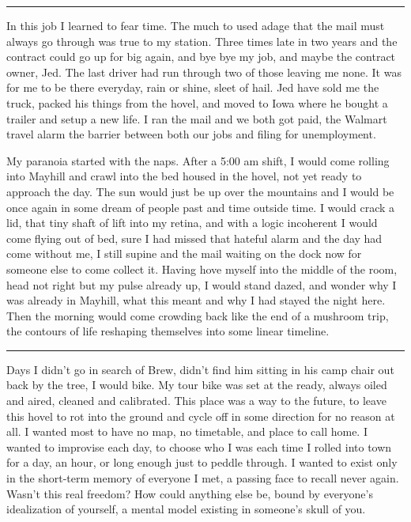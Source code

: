 \documentclass[ebook, 10pt, openright, onecolumn]{memoir}
\newcommand*\td[1]{
  \todo[inline]{
     #1 
  }
}
\newcommand*\starbreak{\fancybreak*{\Large{* * *}}}
\newcommand*\finish{\td{ ----- Finish this section -----}}
\begin{document}
\starbreak

In this job I learned to fear time.  The much to used adage that the mail must
always go through was true to my station. Three times late in two years and the
contract could go up for big again, and bye bye my job, and maybe the contract
owner, Jed.  The last driver had run through two of those leaving me none.  It
was for me to be there everyday, rain or shine, sleet of hail.  Jed have sold me
the truck, packed his things from the hovel, and moved to Iowa where he bought a
trailer and setup a new life.  I ran the mail and we both got paid, the Walmart
travel alarm the barrier between both our jobs and filing for unemployment.

My paranoia started with the naps.  After a 5:00 am shift, I would come rolling
into Mayhill and crawl into the bed housed in the hovel, not yet ready to
approach the day.  The sun would just be up over the mountains and I would be
once again in some dream of people past and time outside time.  I would crack a
lid, that tiny shaft of lift into my retina, and with a logic incoherent I would
come flying out of bed, sure I had missed that hateful alarm and the day had
come without me, I still supine and the mail waiting on the dock now for
someone else to come collect it.  Having hove myself into the middle of the
room, head not right but my pulse already up, I would stand dazed, and wonder
why I was already in Mayhill, what this meant and why I had stayed the night
here.  Then the morning would come crowding back like the end of a mushroom
trip, the contours of life reshaping themselves into some linear timeline. 


\finish


\starbreak

Days I didn't go in search of Brew, didn't find him sitting in his
camp chair out back by the tree, I would bike.  My tour bike was set at the
ready, always oiled and aired, cleaned and calibrated.  This place was a way to
the future, to leave this hovel to rot into the ground and cycle off in some
direction for no reason at all.  I wanted most to have no map, no timetable, and
place to call home.  I wanted to improvise each day, to choose who I was each
time I rolled into town for a day, an hour, or long enough just to peddle
through.  I wanted to exist only in the short-term memory of everyone I met, a
passing face to recall never again.  Wasn't this real freedom?  How could
anything else be, bound by everyone's idealization of yourself, a mental model
existing in someone's skull of you.
\end{document}
